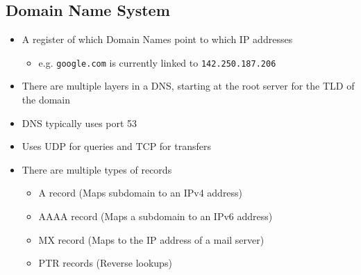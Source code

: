 \subsection*{Domain Name System}

\begin{itemize}
  \item A register of which Domain Names point to which IP addresses
  \begin{itemize}
    \item e.g. \verb|google.com| is currently linked to \verb|142.250.187.206|
  \end{itemize}
  \item There are multiple layers in a DNS, starting at the root server for the TLD of the domain
  \item DNS typically uses port 53
  \item Uses UDP for queries and TCP for transfers
  \item There are multiple types of records
  \begin{itemize}
    \item A record (Maps subdomain to an IPv4 address)
    \item AAAA record (Maps a subdomain to an IPv6 address)
    \item MX record (Maps to the IP address of a mail server)
    \item PTR records (Reverse lookups)
  \end{itemize}
\end{itemize}